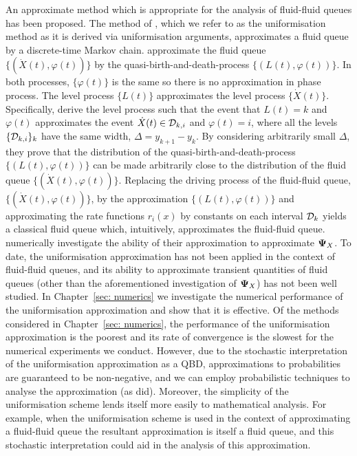 An approximate method which is appropriate for the analysis of fluid-fluid queues has been proposed. The method of \cite{bo2013}, which we refer to as the uniformisation method as it is derived via uniformisation arguments, approximates a fluid queue by a discrete-time Markov chain. \cite{bo2013} approximate the fluid queue \(\{(\dot X(t),\varphi(t))\}\) by the quasi-birth-and-death-process \(\{(L(t),\varphi(t))\}\). In both processes, \(\{\varphi(t)\}\) is the same so there is no approximation in phase process. The level process \(\{L(t)\}\) approximates the level process \(\{\dot X(t)\}\). Specifically, \cite{bo2013} derive the level process such that the event that \(L(t)=k\) and \(\varphi(t)\) approximates the event \(\dot X(t)\in \mathcal{D}_{k,i}\) and \(\varphi(t)=i\), where all the levels \(\{\mathcal{D}_{k,i}\}_{k}\) have the same width, \(\Delta=y_{k+1}-y_k\). By considering arbitrarily small \(\Delta\), they prove that the distribution of the quasi-birth-and-death-process \(\{(L(t),\varphi(t))\}\) can be made arbitrarily close to the distribution of the fluid queue \(\{(\dot X(t),\varphi(t))\}\). Replacing the driving process of the fluid-fluid queue, \(\{(\dot X(t),\varphi(t))\}\), by the approximation \(\{(L(t),\varphi(t))\}\) and approximating the rate functions \(r_i(x)\) by constants on each interval \(\mathcal{D}_k\) yields a classical fluid queue which, intuitively, approximates the fluid-fluid queue. \cite{bo2013} numerically investigate the ability of their approximation to approximate \(\boldsymbol \Psi_X\). To date, the uniformisation approximation has not been applied in the context of fluid-fluid queues, and its ability to approximate transient quantities of fluid queues (other than the aforementioned investigation of \(\boldsymbol\Psi_X\)) has not been well studied. In Chapter~\ref{sec: numerics} we investigate the numerical performance of the uniformisation approximation and show that it is effective. Of the methods considered in Chapter~\ref{sec: numerics}, the performance of the uniformisation approximation is the poorest and its rate of convergence is the slowest for the numerical experiments we conduct. However, due to the stochastic interpretation of the uniformisation approximation as a QBD, approximations to probabilities are guaranteed to be non-negative, and we can employ probabilistic techniques to analyse the approximation (as \cite{bo2013} did). Moreover, the simplicity of the uniformisation scheme lends itself more easily to mathematical analysis. For example, when the uniformisation scheme is used in the context of approximating a fluid-fluid queue the resultant approximation is itself a fluid queue, and this stochastic interpretation could aid in the analysis of this approximation. 

